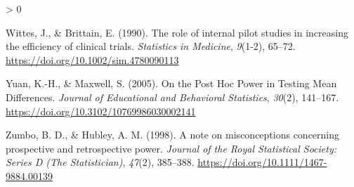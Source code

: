 \documentclass[
  english,
  ,jou,floatsintext]{apa6}
\newlength{\cslhangindent}
\newenvironment{CSLReferences}[2] %
 {%
  \setlength{\parindent}{0pt}
  \ifodd #1 \everypar{\setlength{\hangindent}{\cslhangindent}}\ignorespaces\fi
  \ifnum #2 > 0
  \setlength{\parskip}{#2\baselineskip}
  \fi
 }%
 {}
\begin{document}
\begin{CSLReferences}{1}{0}
\leavevmode\hypertarget{ref-wittes_role_1990}{}%
Wittes, J., \& Brittain, E. (1990). The role of internal pilot studies in increasing the efficiency of clinical trials. \emph{Statistics in Medicine}, \emph{9}(1-2), 65--72. \url{https://doi.org/10.1002/sim.4780090113}

\leavevmode\hypertarget{ref-yuan_post_2005}{}%
Yuan, K.-H., \& Maxwell, S. (2005). On the {Post Hoc Power} in {Testing Mean Differences}. \emph{Journal of Educational and Behavioral Statistics}, \emph{30}(2), 141--167. \url{https://doi.org/10.3102/10769986030002141}

\leavevmode\hypertarget{ref-zumbo_note_1998}{}%
Zumbo, B. D., \& Hubley, A. M. (1998). A note on misconceptions concerning prospective and retrospective power. \emph{Journal of the Royal Statistical Society: Series D (The Statistician)}, \emph{47}(2), 385--388. \url{https://doi.org/10.1111/1467-9884.00139}

\end{CSLReferences}

\endgroup
\end{document}
